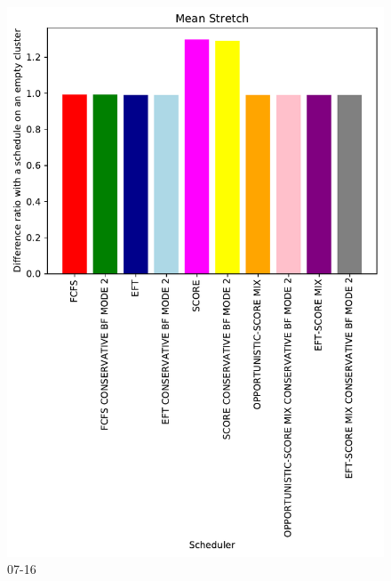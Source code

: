 \documentclass[a4paper]{article}
\begin{document}
\begin{figure}\includegraphics[width=0.9\linewidth]{MBSS/plot/Results_FCFS_Score_Backfill_2022-07-16->2022-07-16_V10000_Mean_Stretch_450_128_32_256_4_1024.pdf}\caption{07-16}\end{figure}
\end{document}
